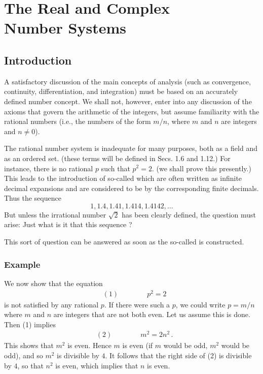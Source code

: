 \setcounter{chapter}{0}
\renewcommand{\thechapter}{1}
\chapter{The Real and Complex\\ Number Systems}\label{ch:1}
\setcounter{equation}{0}	        %

\section{Introduction}\label{sec:1.1}

A satisfactory discussion of the main concepts of analysis (such as convergence, continuity, differentiation, and integration) must be based on an accurately defined number concept. We shall not, however, enter into any discussion of the axioms that govern the arithmetic of the integers, but assume familiarity with the rational numbers (i.e., the numbers of the form $m/n$, where $m$ and $n$ are integers and $n \neq 0$).

The rational number system is inadequate for many purposes, both as a field and as an ordered set. (these terms will be defined in Secs. 1.6 and 1.12.) For instance, there is no rational $p$ such that $p^2 = 2$. (we shall prove this presently.) This leads to the introduction of so-called  which are often written as infinite decimal expansions and are considered to be  by the corresponding finite decimals. Thus the sequence
$$1, 1.4, 1.41, 1.414, 1.4142, \ldots$$ 
 But unless the irrational number $\sqrt{2}$ has been clearly defined, the question must arise: Just what is it that this sequence ?

This sort of question can be answered as soon as the so-called  is constructed.
\subsection{Example}\label{ssec:1.1}
We now show that the equation
\begin{align*}
&(1) \quad\quad\quad\quad p^2 = 2
\end{align*}
is not satisfied by any rational $p$. If there were such a $p$, we could write $p = m/n$ where $m$ and $n$ are integers that are not both even. Let us assume this is done. Then (1) implies     
\begin{align*}
&(2) \quad\quad\quad\quad m^2 = 2n^2\,.
\end{align*}
This shows that $m^2$ is even. Hence $m$ is even (if $m$ would be odd, $m^2$ would be odd), and so $m^2$ is divisible by $4$. It follows that the right side of (2) is divisible by $4$, so that $n^2$ is even, which implies that $n$ is even.

